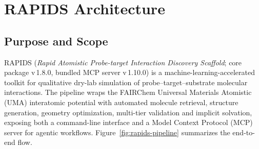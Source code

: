 
\section{RAPIDS Architecture}
\label{sec:rapids-arch}

\subsection{Purpose and Scope}

RAPIDS (\textit{Rapid Atomistic Probe-target Interaction Discovery Scaffold};
core package v\,1.8.0, bundled MCP server v\,1.10.0)
is a machine-learning-accelerated toolkit
for qualitative dry-lab simulation of probe--target--substrate molecular
interactions. The pipeline wraps the FAIRChem Universal Materials
Atomistic (UMA) interatomic potential with automated molecule retrieval,
structure generation, geometry optimization, multi-tier validation and
implicit solvation, exposing both a command-line interface and a
Model Context Protocol (MCP) server for agentic workflows.
Figure~\ref{fig:rapids-pipeline} summarizes the end-to-end flow.

